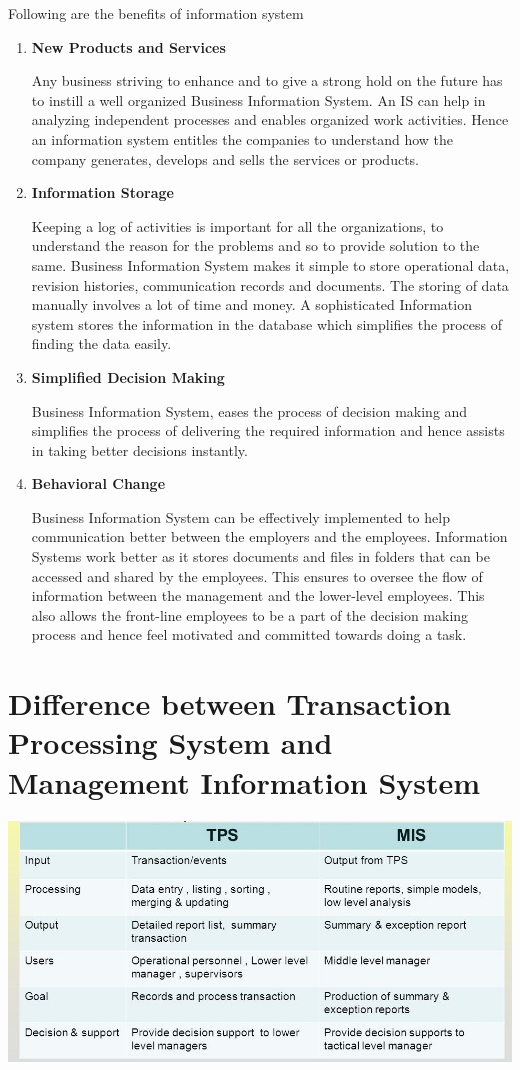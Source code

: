 \documentclass[a4paper]{article}
\begin{document}
Following are the benefits of information system
\begin{enumerate}
  \item \textbf{New Products and Services}

    Any business striving to enhance and to give a strong hold on the future
    has to instill a well organized Business Information System. An IS can
    help in analyzing independent processes and enables organized work
    activities. Hence an information system entitles the companies to
    understand how the company generates, develops and sells the services or
    products.

  \item \textbf{Information Storage}

    Keeping a log of activities is important for all the organizations, to
    understand the reason for the problems and so to provide solution to the
    same. Business Information System makes it simple to store operational
    data, revision histories, communication records and documents. The storing
    of data manually involves a lot of time and money. A sophisticated
    Information system stores the information in the database which simplifies
    the process of finding the data easily.

  \item \textbf{Simplified Decision Making}

    Business Information System, eases the process of decision making and
    simplifies the process of delivering the required information and hence
    assists in taking better decisions instantly.

  \item \textbf{Behavioral Change}

    Business Information System can be effectively implemented to help
    communication better between the employers and the employees. Information
    Systems work better as it stores documents and files in folders that can
    be accessed and shared by the employees. This ensures to oversee the flow
    of information between the management and the lower-level employees. This
    also allows the front-line employees to be a part of the decision
    making process and hence feel motivated and committed towards doing a task.
\end{enumerate}

\section{Difference between Transaction Processing System and Management
Information System}
\includegraphics[scale=0.4]{difftpsmis}
\end{document}
